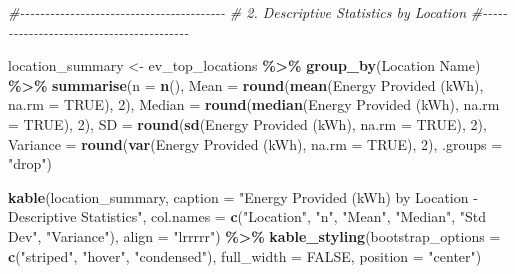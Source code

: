 \documentclass[
  12pt,
]{article}
\newenvironment{Shaded}{\begin{snugshade}}{\end{snugshade}}
\newcommand{\AttributeTok}[1]{\textcolor[rgb]{0.13,0.29,0.53}{#1}}
\newcommand{\CommentTok}[1]{\textcolor[rgb]{0.56,0.35,0.01}{\textit{#1}}}
\newcommand{\ConstantTok}[1]{\textcolor[rgb]{0.56,0.35,0.01}{#1}}
\newcommand{\DecValTok}[1]{\textcolor[rgb]{0.00,0.00,0.81}{#1}}
\newcommand{\FunctionTok}[1]{\textcolor[rgb]{0.13,0.29,0.53}{\textbf{#1}}}
\newcommand{\NormalTok}[1]{#1}
\newcommand{\OtherTok}[1]{\textcolor[rgb]{0.56,0.35,0.01}{#1}}
\newcommand{\SpecialCharTok}[1]{\textcolor[rgb]{0.81,0.36,0.00}{\textbf{#1}}}
\newcommand{\StringTok}[1]{\textcolor[rgb]{0.31,0.60,0.02}{#1}}
\begin{document}
\begin{Shaded}
\begin{Highlighting}[]
\CommentTok{\#{-}{-}{-}{-}{-}{-}{-}{-}{-}{-}{-}{-}{-}{-}{-}{-}{-}{-}{-}{-}{-}{-}{-}{-}{-}{-}{-}{-}{-}{-}{-}{-}{-}{-}{-}{-}{-}{-}{-}{-}{-}}
\CommentTok{\# 2. Descriptive Statistics by Location}
\CommentTok{\#{-}{-}{-}{-}{-}{-}{-}{-}{-}{-}{-}{-}{-}{-}{-}{-}{-}{-}{-}{-}{-}{-}{-}{-}{-}{-}{-}{-}{-}{-}{-}{-}{-}{-}{-}{-}{-}{-}{-}{-}{-}}

\NormalTok{location\_summary }\OtherTok{\textless{}{-}}\NormalTok{ ev\_top\_locations }\SpecialCharTok{\%\textgreater{}\%}
    \FunctionTok{group\_by}\NormalTok{(}\StringTok{\textasciigrave{}}\AttributeTok{Location Name}\StringTok{\textasciigrave{}}\NormalTok{) }\SpecialCharTok{\%\textgreater{}\%}
    \FunctionTok{summarise}\NormalTok{(}\AttributeTok{n =} \FunctionTok{n}\NormalTok{(), }\AttributeTok{Mean =} \FunctionTok{round}\NormalTok{(}\FunctionTok{mean}\NormalTok{(}\StringTok{\textasciigrave{}}\AttributeTok{Energy Provided (kWh)}\StringTok{\textasciigrave{}}\NormalTok{,}
        \AttributeTok{na.rm =} \ConstantTok{TRUE}\NormalTok{), }\DecValTok{2}\NormalTok{), }\AttributeTok{Median =} \FunctionTok{round}\NormalTok{(}\FunctionTok{median}\NormalTok{(}\StringTok{\textasciigrave{}}\AttributeTok{Energy Provided (kWh)}\StringTok{\textasciigrave{}}\NormalTok{,}
        \AttributeTok{na.rm =} \ConstantTok{TRUE}\NormalTok{), }\DecValTok{2}\NormalTok{), }\AttributeTok{SD =} \FunctionTok{round}\NormalTok{(}\FunctionTok{sd}\NormalTok{(}\StringTok{\textasciigrave{}}\AttributeTok{Energy Provided (kWh)}\StringTok{\textasciigrave{}}\NormalTok{,}
        \AttributeTok{na.rm =} \ConstantTok{TRUE}\NormalTok{), }\DecValTok{2}\NormalTok{), }\AttributeTok{Variance =} \FunctionTok{round}\NormalTok{(}\FunctionTok{var}\NormalTok{(}\StringTok{\textasciigrave{}}\AttributeTok{Energy Provided (kWh)}\StringTok{\textasciigrave{}}\NormalTok{,}
        \AttributeTok{na.rm =} \ConstantTok{TRUE}\NormalTok{), }\DecValTok{2}\NormalTok{), }\AttributeTok{.groups =} \StringTok{"drop"}\NormalTok{)}

\FunctionTok{kable}\NormalTok{(location\_summary, }\AttributeTok{caption =} \StringTok{"Energy Provided (kWh) by Location {-} Descriptive Statistics"}\NormalTok{,}
    \AttributeTok{col.names =} \FunctionTok{c}\NormalTok{(}\StringTok{"Location"}\NormalTok{, }\StringTok{"n"}\NormalTok{, }\StringTok{"Mean"}\NormalTok{, }\StringTok{"Median"}\NormalTok{, }\StringTok{"Std Dev"}\NormalTok{,}
        \StringTok{"Variance"}\NormalTok{), }\AttributeTok{align =} \StringTok{"lrrrrr"}\NormalTok{) }\SpecialCharTok{\%\textgreater{}\%}
    \FunctionTok{kable\_styling}\NormalTok{(}\AttributeTok{bootstrap\_options =} \FunctionTok{c}\NormalTok{(}\StringTok{"striped"}\NormalTok{, }\StringTok{"hover"}\NormalTok{, }\StringTok{"condensed"}\NormalTok{),}
        \AttributeTok{full\_width =} \ConstantTok{FALSE}\NormalTok{, }\AttributeTok{position =} \StringTok{"center"}\NormalTok{)}
\end{Highlighting}
\end{Shaded}
\end{document}
